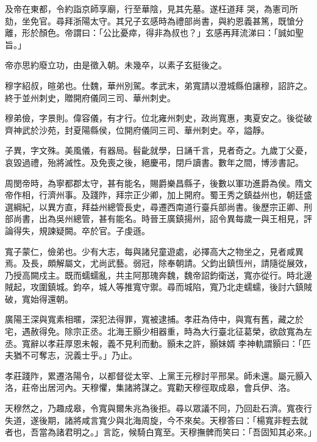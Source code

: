 \begin{pinyinscope}
 及帝在東都，令約詣京師享廟，行至華陰，見其先墓。遂枉道拜
 哭，為憲司所劾，坐免官。尋拜浙陽太守。其兄子玄感時為禮部尚書，與約恩義甚篤，既愴分離，形於顏色。帝謂曰：「公比憂瘁，得非為叔也？」玄感再拜流涕曰：「誠如聖旨。」



 帝亦思約廢立功，由是徵入朝。未幾卒，以素子玄挺後之。



 穆字紹叔，暄弟也。仕魏，華州別駕。孝武末，弟寬請以澄城縣伯讓穆，詔許之。終于並州刺史，贈開府儀同三司、華州刺史。



 穆弟儉，字景則。偉容儀，有才行。位北雍州刺史，政尚寬惠，夷夏安之。後從破齊神武於沙苑，封夏陽縣侯，位開府儀同三司、華州刺史。卒，謚靜。



 子異，字文殊。美風儀，有器局。髫齔就學，日誦千言，見者奇之。九歲丁父憂，哀毀過禮，殆將滅性。及免喪之後，絕慶弔，閉戶讀書。數年之間，博涉書記。



 周閔帝時，為寧都郡太守，甚有能名，賜爵樂昌縣子，後數以軍功進爵為侯。隋文帝作相，行濟州事。及踐阼，拜宗正少卿，加上開府。蜀王秀之鎮益州也，朝廷盛選綱紀，以異方直，拜益州總管長史，尋遷西南道行臺兵部尚書。後歷宗正卿、刑部尚書，出為吳州總管，甚有能名。時晉王廣鎮揚州，詔令異每歲一與王相見，評論得失，規諫疑闕。卒於官。子虔遜。



 寬子蒙仁，儉弟也。少有大志，每與諸兒童遊處，必擇高大之物坐之，見者咸異焉。及長，頗解屬文，尤尚武藝。弱冠，除奉朝請。父鈞出鎮恆州，請隨從展效，乃授高闕戍主。既而蠕蠕亂，共主阿那瑰奔魏，魏帝詔鈞衛送，寬亦從行。時北邊賊起，攻圍鎮城。鈞卒，城人等推寬守禦。尋而城陷，寬乃北走蠕蠕，後討六鎮賊破，寬始得還朝。



 廣陽王深與寬素相暱，深犯法得罪，寬被逮捕。孝莊為侍中，與寬有舊，藏之於宅，遇赦得免。除宗正丞。北海王顥少相器重，時為大行臺北征葛榮，欲啟寬為左丞。寬辭以孝莊厚恩未報，義不見利而動。顥未之許，顥妹婿
 李神軌謂顥曰：「匹夫猶不可奪志，況義士乎。」乃止。



 孝莊踐阼，累遷洛陽令，以都督從太宰、上黨王元穆討平邢杲。師未還。屬元顥入洛，莊帝出居河內。天穆懼，集諸將謀之。寬勸天穆徑取成皋，會兵伊、洛。



 天穆然之，乃趣成皋，令寬與爾朱兆為後拒。尋以眾議不同，乃回赴石濟。寬夜行失道，遂後期，諸將咸言寬少與北海周旋，今不來矣。天穆答曰：「楊寬非輕去就者也，吾當為諸君明之。」言訖，候騎白寬至。天穆撫髀而笑曰：「吾固知其必來。」




\end{pinyinscope}
